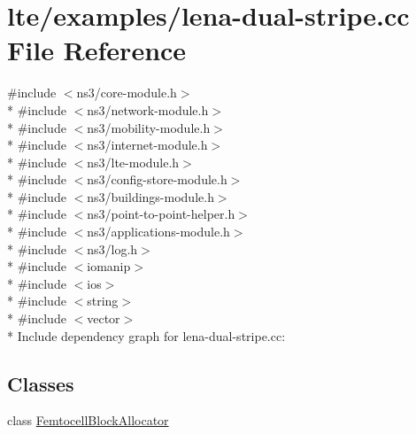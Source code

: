\hypertarget{lena-dual-stripe_8cc}{}\section{lte/examples/lena-\/dual-\/stripe.cc File Reference}
\label{lena-dual-stripe_8cc}
{\ttfamily \#include $<$ns3/core-\/module.\+h$>$}\\*
{\ttfamily \#include $<$ns3/network-\/module.\+h$>$}\\*
{\ttfamily \#include $<$ns3/mobility-\/module.\+h$>$}\\*
{\ttfamily \#include $<$ns3/internet-\/module.\+h$>$}\\*
{\ttfamily \#include $<$ns3/lte-\/module.\+h$>$}\\*
{\ttfamily \#include $<$ns3/config-\/store-\/module.\+h$>$}\\*
{\ttfamily \#include $<$ns3/buildings-\/module.\+h$>$}\\*
{\ttfamily \#include $<$ns3/point-\/to-\/point-\/helper.\+h$>$}\\*
{\ttfamily \#include $<$ns3/applications-\/module.\+h$>$}\\*
{\ttfamily \#include $<$ns3/log.\+h$>$}\\*
{\ttfamily \#include $<$iomanip$>$}\\*
{\ttfamily \#include $<$ios$>$}\\*
{\ttfamily \#include $<$string$>$}\\*
{\ttfamily \#include $<$vector$>$}\\*
Include dependency graph for lena-\/dual-\/stripe.cc\+:
\subsection*{Classes}
\begin{DoxyCompactItemize}
\item 
class \hyperlink{classFemtocellBlockAllocator}{Femtocell\+Block\+Allocator}
\end{DoxyCompactItemize}
